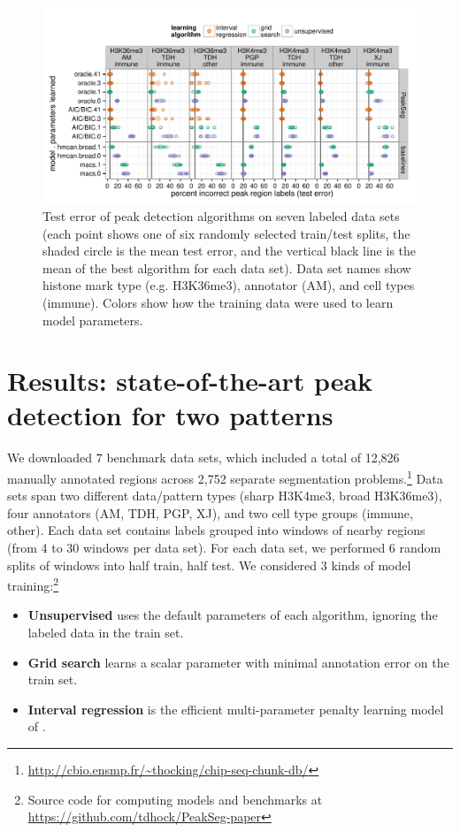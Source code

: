 \documentclass{article}
\begin{document}
\begin{figure}[b!]
  \centering
  \includegraphics[width=\textwidth]{figure-dp-peaks-regression-dots}
  \vskip -0.5cm
  \caption{Test error of peak detection algorithms on seven labeled
    data sets (each point shows one of six randomly selected
    train/test splits, the shaded circle is the mean test error, and
    the vertical black line is the mean of the best algorithm for each
    data set). Data set names show histone mark type (e.g. H3K36me3),
    annotator (AM), and cell types (immune). Colors show how the
    training data were used to learn model parameters.}
  \label{fig:test-error}
\end{figure}

\section{Results: state-of-the-art peak detection
  for two patterns}
\label{sec:results}

We downloaded 7 benchmark data sets, which included a total of 12,826
manually annotated regions across 2,752 separate segmentation
problems.\footnote{\url{http://cbio.ensmp.fr/~thocking/chip-seq-chunk-db/}}
Data sets span two different data/pattern types (sharp H3K4me3, broad
H3K36me3), four annotators (AM, TDH, PGP, XJ), and two cell type
groups (immune, other). Each data set contains labels grouped into
windows of nearby regions (from 4 to 30 windows per data set). For
each data set, we performed 6 random splits of windows into half
train, half test.  We
considered 3 kinds of model training:\footnote{Source code for computing models and benchmarks at\\
  \url{https://github.com/tdhock/PeakSeg-paper} }
\begin{itemize}
\item \textbf{Unsupervised} uses the default parameters of each
  algorithm, ignoring the labeled data in the train set.
\item \textbf{Grid search} learns a scalar parameter with minimal
  annotation error on the train set.
\item \textbf{Interval regression} is the efficient multi-parameter
  penalty learning model of \citet{HOCKING-penalties}.
\end{itemize}
\end{document}
